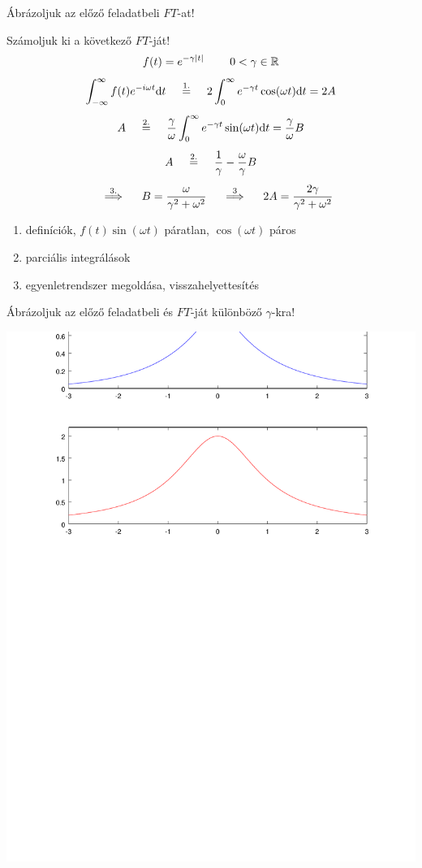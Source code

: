 \feladat Ábrázoljuk az előző feladatbeli $FT$-at!



\feladat Számoljuk ki a következő \fv{}$FT$-ját!
\begin{equation*}
   f(t)=e^{-\gamma \vert t \vert} \kh\kh 0<\gamma \in \mathbb{R}
\end{equation*}
\begin{gather*}
\mhint{-\infty}{\infty}{f(t) e^{-i\omega t}}{t} \opover{1.}{=}
2\mhint{0}{\infty}{e^{-\gamma t}\cos(\omega t)}{t} = 2A\us
A \opover{2.}{=} \frac{\gamma}{\omega} \mhint{0}{\infty}{e^{-\gamma t}\sin(\omega t)}{t} =
\frac{\gamma}{\omega} B \us
A \opover{2.}{=} \frac{1}{\gamma} - \frac{\omega}{\gamma}B \us
\opover{3.}{\implies} B = \frac{\omega}{\gamma^2+\omega^2} \opover{3}{\implies} 2A = \frac{2\gamma}{\gamma^2+\omega^2}
\end{gather*}
\magy
\begin{enumerate}
\item definíciók, $f(t)\sin(\omega t)$ páratlan, $\cos(\omega t)$ páros
\item parciális integrálások
\item egyenletrendszer megoldása, visszahelyettesítés
\end{enumerate}

\feladat Ábrázoljuk az előző feladatbeli  és $FT$-ját különböző
$\gamma$-kra!
%
\begin{center}
\includegraphics[scale=0.9]{expabszol}
\end{center}


